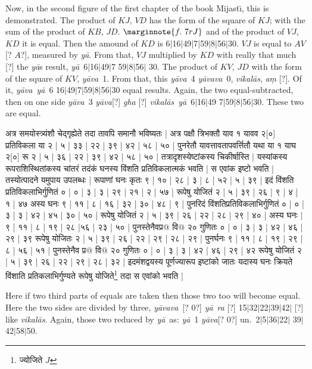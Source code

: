 \documentclass[12pt]{book}
\let\*=\d
\def\ya{\textit{y\=a}}
\def\yava{\textit{y\=ava}}
\def\yavava{\textit{y\=avava}}
\def\vikalas{\textit{vi\-ka\-l\=as}}
\def\danda{$|$}
\begin{document}
Now, in the second figure of the first chapter of the book Mijast\={\i}, this is demonstrated.
The product of $KJ$, $VD$ has the form of the square of $KJ$; with
the sum of the product of $KB$, $JD$. 
$\marginnote{f.~7r J}$
and of the product of $VJ$, $KD$ it is equal.  Then the amound of $KD$ is 
6\danda 16\danda 49\danda 7\danda 59\danda 8\danda 56\danda 30.  $VJ$ is equal to 
$AV$ [? $A$?], measured by \ya.  From that, $VJ$ multiplied by $KD$ with really
that much [?] the \ya s result, \ya\ 6\danda 16\danda 49\danda 7 59\danda 8\danda 56\danda
30. 
The product of $KV$, $JD$ with the form of
the square of $KV$, \yava\ 1. From that, this \yava\ 4 \yavava\ 0, \vikalas, 
\textit{a\*m} [?]. Of it, \yava\ \ya\ 6 16\danda 49\danda 7\danda 59\danda 8\danda 56\danda 30
equal results. Again, the two equal-subtracted, then on one side \yava\ 3 \yava  [?] \textit{gha} [?]
\vikalas\ \ya\ 6\danda 16\danda 49 7\danda 59\danda 8\danda 56\danda 30. These two are equal.

\newpage


{\s अत्र समयोस्त्र्यंशौ चेद्गृह्येते तदा तावपि
समानौ भविष्यतः | अत्र पक्षौ त्रिभक्तौ याव १ यावव २[०] प्रतिविकला 
या २ | ५ | ३३ | २२ | ३९ | ४२ | ५८ | ५० |
पुनरेतौ यावत्तावतापवर्त्तितौ यथा या १
याघ २[०] रू २ | ५ | ३६ | २२ | ३९ | ४२ | ५८ | ५० |
तत्रादृशस्येष्टांकस्य चिकीर्षास्ति | यस्यांकस्य रूपराशिस्थितांकस्य चांतरं तदंकं घनस्य विंशति
प्रतिविकलात्मकं भवति | स एवांक इष्टो भवति | तस्योत्पादने यमुपाय उपलब्धः | रूपाणां घनः कृतः ९ | १० | २८ | ३ | ८ | ५२ | ५ | ३९ |
इदं विंशति प्रतिविकलाभिर्गुणितं ० | ० | ३ | ३ | २९ | २१ | २ | ५७ | रूपेषु योजितं २ | ५ | ३९ | २६ | ९ | ४ | १ | ४७ अस्य घनः ९ | ११ | ८ | १६ | ३२ | ३० | ४८ | ९ | पुनरिदं विंशतिप्रतिविकलाभिर्गुणितं ० | ० | ३ | ३ | ४२ | ४५ | ३० | ५० |
रूपेषु योजितं २ | ५ | ३९ | २६ | २२ | २८ | २९ | ४० | अस्य घनः $|$  
९ | ११ | ८ | १९ | २८ |५६ | २३ | ५० | पुनस्तेनैवप्र@ वि@
२० गुणितः ० | ० | ३ | ३ | ४२ | ४६ | २९ | ३९
रूपेषु योजितः २ | ५ | ३९ | २६ | २२ | २९ | २८ | २९ | पुनर्घनः ९ | ११ | ८ | १९ | २९ | ८ | ५६ | ५१ | पुनस्तेनैव प्र@ वि@ २० गुणितः ० | ० | ३ | ३ | ४२ | ४६ | २९ | ४२
रूपेषु योजितं २ | ५ | ३९ | २६ | २२ | २९ | २८ | ३२ |
इदमंशद्वयस्य पूर्णज्यारूप इष्टांको जातः यदास्य घनः क्रियते विंशाति प्रतिकलाभिर्गुण्यते
रूपेषु योजिते\footnote{{\s ज्योजिते} $J$} तदा स एवांको भवति |} 

\newpage

Here if two third parts of equals are taken then those two too will become equal.   Here the two sides
are divided by three, \yavava\ [? 0?] \ya\ \textit{ra} [?] 15\danda 32\danda 22\danda 39\danda 42\danda
[?] like \vikalas.
Again, those two reduced by \ya\ as: \ya\ 1 \yava [? 0?] un.\ 2\danda 5\danda 36\danda 22\danda 
39\danda 42\danda 58\danda 50. 
\end{document}
